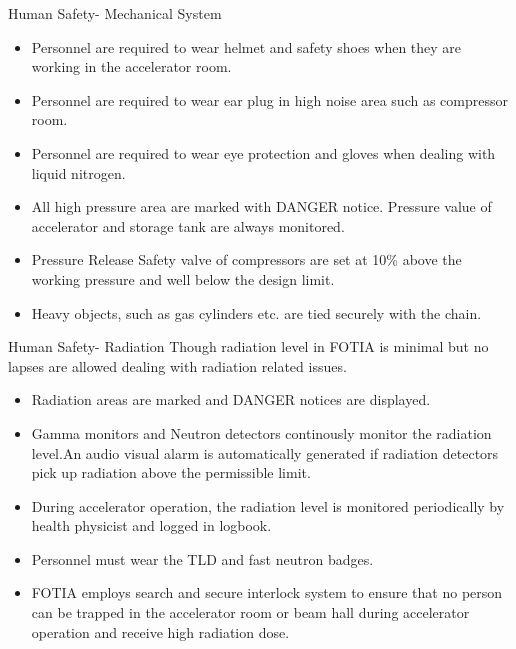 \documentclass[11pt]{beamer}
\begin{document}
\begin{frame}{Human Safety- Mechanical System}

 \begin{itemize} 
 \item Personnel are required to wear helmet and safety shoes when they are working in the accelerator room.
 \item Personnel are required to wear ear plug in high noise area such as compressor room.
 \item Personnel are required to wear eye protection and gloves when dealing with liquid nitrogen.
 \item All high pressure area are marked with DANGER notice. Pressure value of accelerator and storage tank are always monitored.
 \item Pressure  Release Safety valve of compressors are set at 10\% above the working pressure and well below the design limit.
 \item Heavy objects, such as gas cylinders etc. are tied securely with the chain. 
\end{itemize}		
	 
\end{frame}



\begin{frame}{Human Safety- Radiation}
Though radiation level in FOTIA is minimal but no lapses are allowed dealing with radiation related issues.
\begin{itemize} 
 \item Radiation areas are marked and DANGER notices are  displayed.
 \item Gamma monitors and Neutron detectors continously monitor the radiation level.An audio visual alarm is automatically generated if radiation detectors pick up radiation above the permissible limit.
 \item During accelerator operation, the radiation level is monitored periodically by health physicist and logged in logbook. 
 \item Personnel must wear the TLD and fast neutron badges.
 \item FOTIA employs search and secure interlock system to ensure that no person can be trapped in the accelerator room or beam hall during accelerator operation and receive high radiation dose. 
\end{itemize}		
	 
 
\end{frame}
\end{document}
